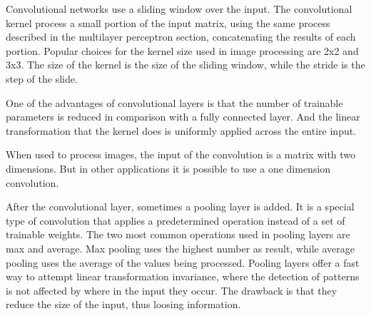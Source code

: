 Convolutional networks \cite{lecun_backpropagation_1989}\cite{lecun_convolutional_1995} use a sliding window over the input. The convolutional kernel process a small portion of the input matrix, using the same process described in the multilayer perceptron section, concatenating the results of each portion. Popular choices for the kernel size used in image processing are 2x2 and 3x3. The size of the kernel is the size of the sliding window, while the stride is the step of the slide.

One of the advantages of convolutional layers is that the number of trainable parameters is reduced in comparison with a fully connected layer. And the linear transformation that the kernel does is uniformly applied across the entire input.

When used to process images, the input of the convolution is a matrix with two dimensions. But in other applications it is possible to use a one dimension convolution.

After the convolutional layer, sometimes a pooling layer is added. It is a special type of convolution that applies a predetermined operation instead of a set of trainable weights. The two most common operations used in pooling layers are max and average. Max pooling uses the highest number as result, while average pooling uses the average of the values being processed. Pooling layers offer a fast way to attempt linear transformation invariance, where the detection of patterns is not affected by where in the input they occur. The drawback is that they reduce the size of the input, thus loosing information.